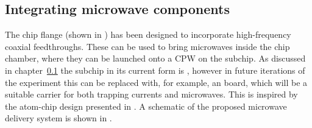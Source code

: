 
\subsection{Integrating microwave components}

The chip flange (shown in ) has been
designed to incorporate high-frequency coaxial feedthroughs.  These can be used to bring microwaves inside the chip chamber,
where they can be launched onto a CPW on the subchip. As discussed in
chapter~\ref{} the subchip in its current form is ,
however in future iterations of the experiment this can be replaced with, for
example, an  board, which will be a suitable
carrier for both trapping currents and microwaves. This is inspired by the
atom-chip design presented in . A schematic of the proposed
microwave delivery system is shown in .

